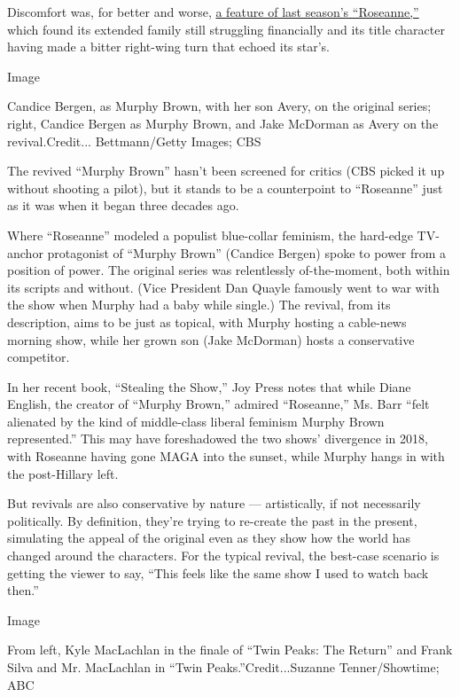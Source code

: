 Discomfort was, for better and worse,
\href{https://www.nytimes.com/2018/05/22/arts/television/roseanne-season-finale-roseanne-barr.html}{a
feature of last season's ``Roseanne,''} which found its extended family
still struggling financially and its title character having made a
bitter right-wing turn that echoed its star's.

Image

Candice Bergen, as Murphy Brown, with her son Avery, on the original
series; right, Candice Bergen as Murphy Brown, and Jake McDorman as
Avery on the revival.Credit... Bettmann/Getty Images; CBS

The revived ``Murphy Brown'' hasn't been screened for critics (CBS
picked it up without shooting a pilot), but it stands to be a
counterpoint to ``Roseanne'' just as it was when it began three decades
ago.

Where ``Roseanne'' modeled a populist blue-collar feminism, the
hard-edge TV-anchor protagonist of ``Murphy Brown'' (Candice Bergen)
spoke to power from a position of power. The original series was
relentlessly of-the-moment, both within its scripts and without. (Vice
President Dan Quayle famously went to war with the show when Murphy had
a baby while single.) The revival, from its description, aims to be just
as topical, with Murphy hosting a cable-news morning show, while her
grown son (Jake McDorman) hosts a conservative competitor.

In her recent book, ``Stealing the Show,'' Joy Press notes that while
Diane English, the creator of ``Murphy Brown,'' admired ``Roseanne,''
Ms. Barr ``felt alienated by the kind of middle-class liberal feminism
Murphy Brown represented.'' This may have foreshadowed the two shows'
divergence in 2018, with Roseanne having gone MAGA into the sunset,
while Murphy hangs in with the post-Hillary left.

But revivals are also conservative by nature --- artistically, if not
necessarily politically. By definition, they're trying to re-create the
past in the present, simulating the appeal of the original even as they
show how the world has changed around the characters. For the typical
revival, the best-case scenario is getting the viewer to say, ``This
feels like the same show I used to watch back then.''

Image

From left, Kyle MacLachlan in the finale of ``Twin Peaks: The Return''
and Frank Silva and Mr. MacLachlan in ``Twin Peaks.''Credit...Suzanne
Tenner/Showtime; ABC

